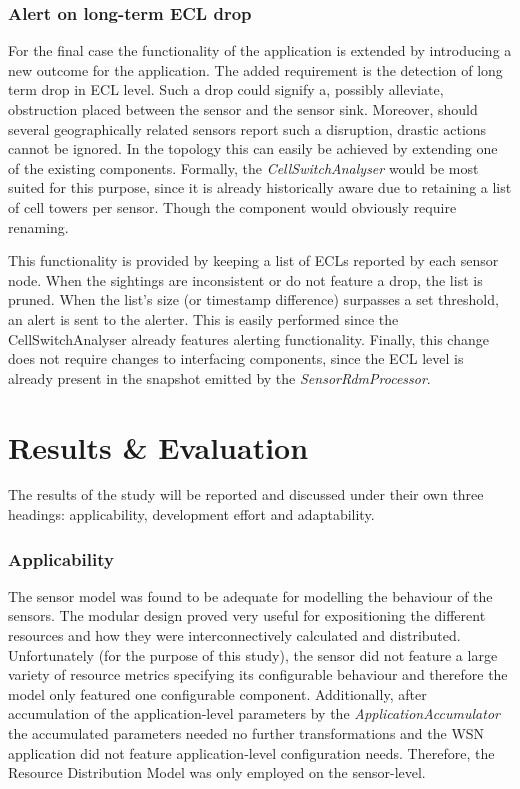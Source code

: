 \subsubsection{Alert on long-term ECL drop}
For the final case the functionality of the application is extended by introducing a new outcome for the application. The added requirement is the detection of long term drop in ECL level. Such a drop could signify a, possibly alleviate, obstruction placed between the sensor and the sensor sink. Moreover, should several geographically related sensors report such a disruption, drastic actions cannot be ignored. In the topology this can easily be achieved by extending one of the existing components. Formally, the \emph{CellSwitchAnalyser} would be most suited for this purpose, since it is already historically aware due to retaining a list of cell towers per sensor. Though the component would obviously require renaming.

This functionality is provided by keeping a list of ECLs reported by each sensor node. When the sightings are inconsistent or do not feature a drop, the list is pruned. When the list's size (or timestamp difference) surpasses a set threshold, an alert is sent to the alerter. This is easily performed since the CellSwitchAnalyser already features alerting functionality. Finally, this change does not require changes to interfacing components, since the ECL level is already present in the snapshot emitted by the \emph{SensorRdmProcessor}.

\section{Results \& Evaluation}
\label{sec:resultseval}
The results of the study will be reported and discussed under their own three headings: applicability, development effort and adaptability.

\subsubsection{Applicability}
The sensor model was found to be adequate for modelling the behaviour of the \sensit sensors. The modular design proved very useful for expositioning the different resources and how they were interconnectively calculated and distributed. Unfortunately (for the purpose of this study), the sensor did not feature a large variety of resource metrics specifying its configurable behaviour and therefore the model only featured one configurable component. Additionally, after accumulation of the application-level parameters by the \emph{ApplicationAccumulator} the accumulated parameters needed no further transformations and the WSN application did not feature application-level configuration needs. Therefore, the Resource Distribution Model was only employed on the sensor-level.

